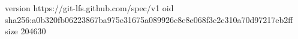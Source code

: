 version https://git-lfs.github.com/spec/v1
oid sha256:a0b320fb06223867ba975e31675a089926c8e8e068f3c2c310a70d97217eb2ff
size 204630
